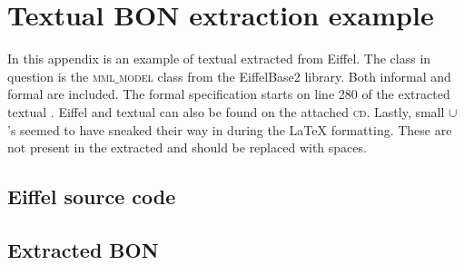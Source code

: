 \chapter{Textual BON extraction example}
In this appendix is an example of textual \bon{} extracted from Eiffel. The class in question is the \textsc{mml$\_$model} class from the EiffelBase2 library. Both informal and formal \bon are included. The formal \bon{} specification starts on line 280 of the extracted textual \bon{}. Eiffel and textual \bon{} can also be found on the attached \textsc{cd}. Lastly, small $\cup$'s seemed to have sneaked their way in during the \LaTeX{} formatting. These are not present in the extracted \bon{} and should be replaced with spaces.
\section{Eiffel source code}
\label{appendix-bon-extraction-example}
\lstset{
basicstyle=\ttfamily\scriptsize,
language=Eiffel,
numbers=left
}

\break
\section{Extracted BON}
\lstset{
basicstyle=\ttfamily\scriptsize,
numbers=left
}

